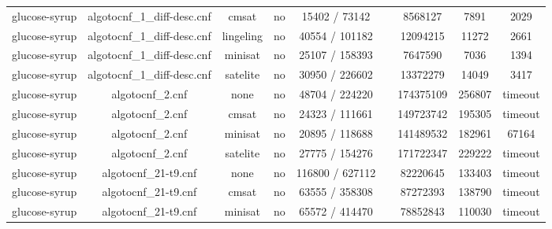 \begin{appendices}
\begin{table}[p]
\begin{center}
\begin{tabular}{l|cccccccc}
  glucose-syrup                  & algotocnf\_1\_diff-desc.cnf    & cmsat      & no    & 15402 / 73142 &           & 8568127   & 7891       & 2029 \\ %
  glucose-syrup                  & algotocnf\_1\_diff-desc.cnf    & lingeling  & no    & 40554 / 101182 &           & 12094215  & 11272      & 2661 \\ %
  glucose-syrup                  & algotocnf\_1\_diff-desc.cnf    & minisat    & no    & 25107 / 158393 &           & 7647590   & 7036       & 1394 \\ %
  glucose-syrup                  & algotocnf\_1\_diff-desc.cnf    & satelite   & no    & 30950 / 226602 &           & 13372279  & 14049      & 3417 \\ %
  glucose-syrup                  & algotocnf\_2.cnf               & none       & no    & 48704 / 224220 &           & 174375109 & 256807     & timeout \\ %
  glucose-syrup                  & algotocnf\_2.cnf               & cmsat      & no    & 24323 / 111661 &           & 149723742 & 195305     & timeout \\ %
  glucose-syrup                  & algotocnf\_2.cnf               & minisat    & no    & 20895 / 118688 &           & 141489532 & 182961     & 67164 \\ %
  glucose-syrup                  & algotocnf\_2.cnf               & satelite   & no    & 27775 / 154276 &           & 171722347 & 229222     & timeout \\ %
  glucose-syrup                  & algotocnf\_21-t9.cnf           & none       & no    & 116800 / 627112 &           & 82220645  & 133403     & timeout \\ %
  glucose-syrup                  & algotocnf\_21-t9.cnf           & cmsat      & no    & 63555 / 358308 &           & 87272393  & 138790     & timeout \\ %
  glucose-syrup                  & algotocnf\_21-t9.cnf           & minisat    & no    & 65572 / 414470 &           & 78852843  & 110030     & timeout \\ %

\end{tabular}
\end{center}
\end{table}
\end{appendices}
